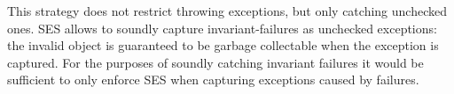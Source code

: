 
\noindent This strategy does not restrict throwing exceptions, but only catching unchecked ones.
SES allows to soundly capture invariant-failures as unchecked exceptions: 
the invalid object is guaranteed to be garbage collectable when the exception is captured. For the purposes of soundly catching invariant failures it would be sufficient to only enforce SES when capturing exceptions caused by \Q@invariant@ failures.





% 



\loseSpace


